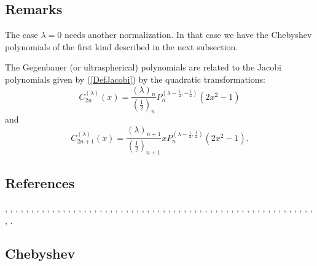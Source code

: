 \documentclass[envcountchap,graybox]{svmono}
\begin{document}
\subsection*{Remarks}
The case $\lambda=0$ needs another normalization. In that case we have the
Chebyshev polynomials of the first kind described in the next subsection.

\noindent
The Gegenbauer (or ultraspherical) polynomials are related to the Jacobi polynomials
given by (\ref{DefJacobi}) by the quadratic transformations:
$$C_{2n}^{(\lambda)}(x)=\frac{(\lambda)_n}{(\frac{1}{2})_n}
P_n^{(\lambda-\frac{1}{2},-\frac{1}{2})}(2x^2-1)$$
and
$$C_{2n+1}^{(\lambda)}(x)=\frac{(\lambda)_{n+1}}{(\frac{1}{2})_{n+1}}
xP_n^{(\lambda-\frac{1}{2},\frac{1}{2})}(2x^2-1).$$

\subsection*{References}
\cite{Abram}, \cite{Ahmed+86}, \cite{AndrewsAskeyRoy}, \cite{Area+I}, \cite{Askey67}, \cite{Askey74}, \cite{Askey75},
\cite{Askey89I}, \cite{AskeyFitch}, \cite{AskeyKoornRahman}, \cite{Berg}, \cite{BilodeauI},
\cite{BojanovNikolov}, \cite{Brafman51}, \cite{Brafman57I}, \cite{Brown},
\cite{BustozIsmail82}, \cite{BustozIsmail83}, \cite{BustozIsmail89}, \cite{BustozSavage79},
\cite{BustozSavage80}, \cite{Carlitz61II}, \cite{Chihara78}, \cite{Common}, \cite{Danese},
\cite{Dette94}, \cite{DijksmaKoorn}, \cite{DilcherStolarsky}, \cite{Dimitrov96},
\cite{Dimitrov2003}, \cite{Doha2002II}, \cite{Driver}, \cite{ElbertLaforgia86I},
\cite{ElbertLaforgia86II}, \cite{ElbertLaforgia90}, \cite{Erdelyi+}, \cite{Exton96},
\cite{Gasper69}, \cite{Gasper72II}, \cite{Gasper85}, \cite{Grad}, \cite{Ismail74},
\cite{Ismail2005II}, \cite{Koekoek2000}, \cite{Koorn88}, \cite{Laforgia}, \cite{LewanowiczI},
\cite{Lorch}, \cite{Mathai}, \cite{Nagel}, \cite{Nikiforov+}, \cite{NikiforovUvarov},
\cite{RahmanShah}, \cite{Rainville}, \cite{Reimer}, \cite{Sartoretto}, \cite{Srivastava71},
\cite{Szego75}, \cite{Temme}, \cite{Viswanathan}, \cite{Zayed}.

\subsection{Chebyshev}

\par
\end{document}
